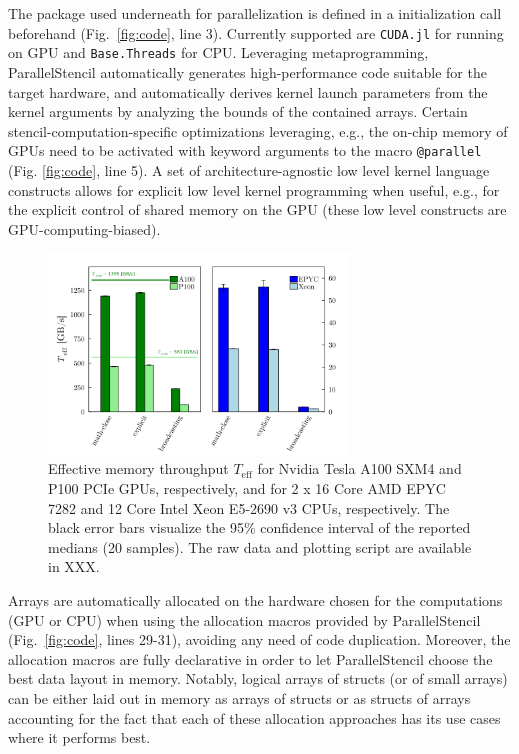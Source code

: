 \documentclass{juliacon}
\begin{document}
The package used underneath for parallelization is defined in a initialization call beforehand (Fig.~\ref{fig:code}, line 3). Currently supported are \texttt{CUDA.jl} \cite{besard2018effective} for running on GPU and \texttt{Base.Threads} for CPU. Leveraging metaprogramming, ParallelStencil automatically generates high-performance code suitable for the target hardware, and automatically derives kernel launch parameters from the kernel arguments by analyzing the bounds of the contained arrays. Certain stencil-computation-specific optimizations leveraging, e.g., the on-chip memory of GPUs need to be activated with keyword arguments to the macro \texttt{@parallel} (Fig. \ref{fig:code}, line 5). A set of architecture-agnostic low level kernel language constructs allows for explicit low level kernel programming when useful, e.g., for the explicit control of shared memory on the GPU (these low level constructs are GPU-computing-biased). 

\begin{figure}[t]
    \centerline{\includegraphics[width=8cm]{julia_xpu_Teff.png}}
    \caption{Effective memory throughput $T_\mathrm{eff}$ for Nvidia Tesla A100 SXM4 and P100 PCIe GPUs, respectively, and for 2 x 16 Core AMD EPYC 7282 and 12 Core Intel Xeon E5-2690 v3 CPUs, respectively. The black error bars visualize the 95\% confidence interval of the reported medians (20 samples). The raw data and plotting script are available in XXX.}
	\label{fig:performance}
\end{figure}

Arrays are automatically allocated on the hardware chosen for the computations (GPU or CPU) when using the allocation macros provided by ParallelStencil (Fig.~\ref{fig:code}, lines 29-31), avoiding any need of code duplication. Moreover, the allocation macros are fully declarative in order to let ParallelStencil choose the best data layout in memory. Notably, logical arrays of structs (or of small arrays) can be either laid out in memory as arrays of structs or as structs of arrays accounting for the fact that each of these allocation approaches has its use cases where it performs best.
\end{document}
